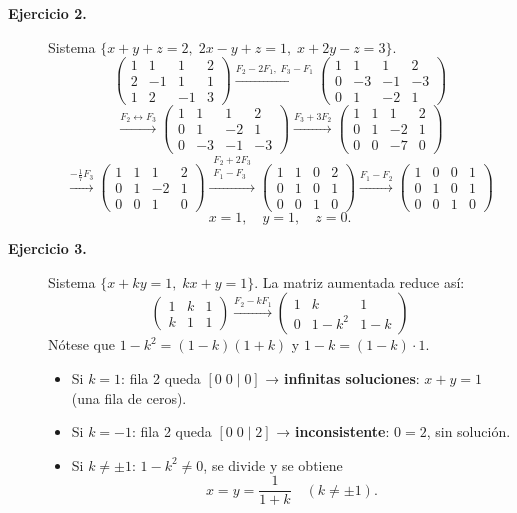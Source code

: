 \documentclass[11pt,letterpaper]{article}
\theoremstyle{definition}
\theoremstyle{plain}
\begin{document}
\begin{description}
\item[\textbf{Ejercicio 2.}]
Sistema $\{x+y+z=2,\;2x-y+z=1,\;x+2y-z=3\}$.
\[
  \left(\begin{array}{ccc|c}1&1&1&2\\2&-1&1&1\\1&2&-1&3\end{array}\right)
  \xrightarrow{F_2-2F_1,\;F_3-F_1}
  \left(\begin{array}{ccc|c}1&1&1&2\\0&-3&-1&-3\\0&1&-2&1\end{array}\right)
\]
\[
  \xrightarrow{F_2\leftrightarrow F_3}
  \left(\begin{array}{ccc|c}1&1&1&2\\0&1&-2&1\\0&-3&-1&-3\end{array}\right)
  \xrightarrow{F_3+3F_2}
  \left(\begin{array}{ccc|c}1&1&1&2\\0&1&-2&1\\0&0&-7&0\end{array}\right)
\]
\[
  \xrightarrow{-\frac{1}{7}F_3}
  \left(\begin{array}{ccc|c}1&1&1&2\\0&1&-2&1\\0&0&1&0\end{array}\right)
  \xrightarrow{\substack{F_2+2F_3\\F_1-F_3}}
  \left(\begin{array}{ccc|c}1&1&0&2\\0&1&0&1\\0&0&1&0\end{array}\right)
  \xrightarrow{F_1-F_2}
  \left(\begin{array}{ccc|c}1&0&0&1\\0&1&0&1\\0&0&1&0\end{array}\right)
\]
\[\boxed{x=1,\quad y=1,\quad z=0.}\]

\item[\textbf{Ejercicio 3.}]
Sistema $\{x+ky=1,\;kx+y=1\}$. La matriz aumentada reduce así:
\[
  \left(\begin{array}{cc|c}1&k&1\\k&1&1\end{array}\right)
  \xrightarrow{F_2-kF_1}
  \left(\begin{array}{cc|c}1&k&1\\0&1-k^2&1-k\end{array}\right)
\]
Nótese que $1-k^2=(1-k)(1+k)$ y $1-k=(1-k)\cdot 1$.
\begin{itemize}
  \item Si $k=1$: fila 2 queda $[0\;0\mid 0]$ →
        \textbf{infinitas soluciones}: $x+y=1$ (una fila de ceros).
  \item Si $k=-1$: fila 2 queda $[0\;0\mid 2]$ →
        \textbf{inconsistente}: $0=2$, sin solución.
  \item Si $k\neq\pm 1$: $1-k^2\neq 0$, se divide y se obtiene
        \[\boxed{x=y=\frac{1}{1+k}\quad(k\neq\pm 1).}\]
\end{itemize}


\end{description}
\end{document}
